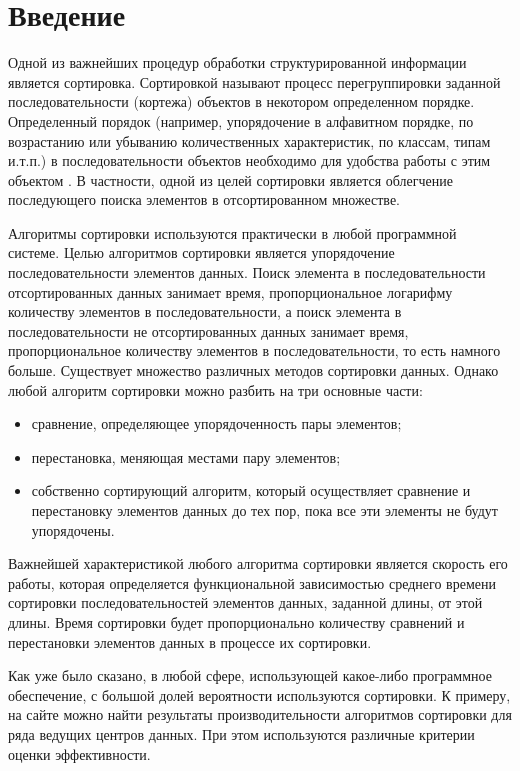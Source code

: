 \chapter*{Введение}

Одной из важнейших процедур обработки структурированной информации является сортировка. Сортировкой называют процесс перегруппировки заданной последовательности (кортежа) объектов в некотором определенном порядке. Определенный порядок (например, упорядочение в алфавитном порядке, по возрастанию или убыванию количественных характеристик, по классам, типам и.т.п.) в последовательности объектов необходимо для удобства работы с этим объектом . В частности, одной из целей сортировки является облегчение последующего поиска элементов в отсортированном множестве. 

Алгоритмы сортировки используются практически в любой программной системе. Целью алгоритмов сортировки является упорядочение последовательности элементов данных. Поиск элемента в последовательности отсортированных данных занимает время, пропорциональное логарифму количеству элементов в последовательности, а поиск элемента в последовательности не отсортированных данных занимает время, пропорциональное количеству элементов в последовательности, то есть намного больше. Существует множество различных методов сортировки данных. Однако любой алгоритм сортировки можно разбить на три основные части:
\begin{itemize}
    \item сравнение, определяющее упорядоченность пары элементов;
    \item перестановка, меняющая местами пару элементов;
    \item собственно сортирующий алгоритм, который осуществляет сравнение и перестановку элементов данных до тех пор, пока все эти элементы не будут упорядочены.
\end{itemize}

Важнейшей характеристикой любого алгоритма сортировки является скорость его работы, которая определяется функциональной зависимостью среднего времени сортировки последовательностей элементов данных, заданной длины, от этой длины. Время сортировки будет пропорционально количеству сравнений и перестановки элементов данных в процессе их сортировки.

Как уже было сказано, в любой сфере, использующей какое-либо программное обеспечение, с большой долей вероятности используются сортировки. К примеру, на сайте можно найти результаты производительности алгоритмов сортировки для ряда ведущих центров данных. При этом используются различные критерии оценки эффективности.

